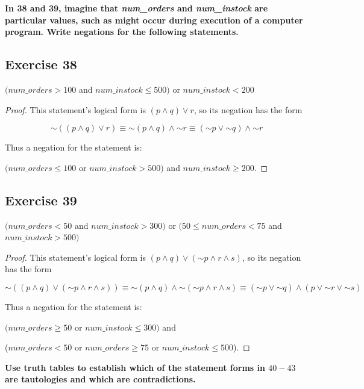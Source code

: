 \documentclass[14pt]{extarticle}
\begin{document}
{\bf In 38 and 39, imagine that {\it num\_orders} and {\it num\_instock} are
particular values, such as might occur during execution of a computer program.
Write negations for the following statements.}

\subsection{Exercise 38} $(num\_orders > 100$ and $num\_instock \leq 500)$ or
$num\_instock < 200$

\begin{proof} This statement’s logical form is $(p \wedge q) \vee r$, so its
negation has the form

$$ {\sim((p \wedge q) \vee r)} \equiv {\sim (p \wedge q)} \wedge {\sim r} \equiv
({\sim p} \vee {\sim q}) \wedge {\sim r} $$

Thus a negation for the statement is:

$(num\_orders \leq 100$ or $num\_instock > 500)$ and $num\_instock \geq 200$.
\end{proof}

\subsection{Exercise 39} $(num\_orders < 50$ and $num\_instock > 300)$ or
$(50 \leq num\_orders < 75$ and $num\_instock > 500)$

\begin{proof} This statement’s logical form is $(p \wedge q) \vee ({\sim p}
\wedge r \wedge s)$, so its negation has the form

$$ {\sim((p \wedge q) \vee ({\sim p} \wedge r \wedge s))} \equiv {\sim(p \wedge
q)} \wedge {\sim({\sim p} \wedge r \wedge s)} \equiv ({\sim p} \vee {\sim q})
\wedge (p \vee {\sim r} \vee {\sim s}) $$

Thus a negation for the statement is:

$(num\_orders \geq 50$ or $num\_instock \leq 300)$ and

($num\_orders < 50$ or $num\_orders \geq 75$ or $num\_instock \leq 500$).
\end{proof}

{\bf Use truth tables to establish which of the statement forms in $40-43$ are
tautologies and which are contradictions.}
\end{document}
